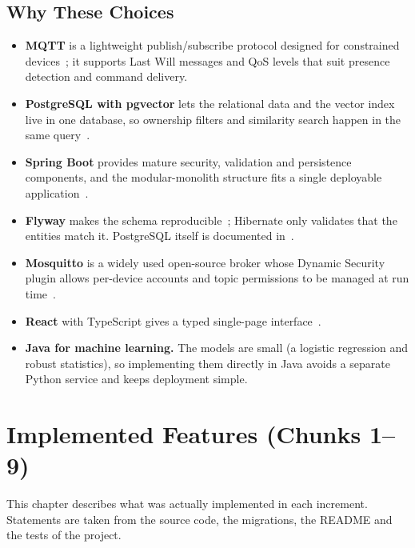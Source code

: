 \documentclass[12pt,a4paper,oneside]{report}
\begin{document}
\section{Why These Choices}
\begin{itemize}
  \item \textbf{MQTT} is a lightweight publish/subscribe protocol designed for constrained devices~\cite{mqtt311}; it supports Last Will messages and QoS levels that suit presence detection and command delivery.
  \item \textbf{PostgreSQL with pgvector} lets the relational data and the vector index live in one database, so ownership filters and similarity search happen in the same query~\cite{pgvector}.
  \item \textbf{Spring Boot} provides mature security, validation and persistence components, and the modular-monolith structure fits a single deployable application~\cite{springboot}.
  \item \textbf{Flyway} makes the schema reproducible~\cite{flyway}; Hibernate only validates that the entities match it. PostgreSQL itself is documented in~\cite{postgres}.
  \item \textbf{Mosquitto} is a widely used open-source broker whose Dynamic Security plugin allows per-device accounts and topic permissions to be managed at run time~\cite{mosquitto}.
  \item \textbf{React} with TypeScript gives a typed single-page interface~\cite{react}.
  \item \textbf{Java for machine learning.} The models are small (a logistic regression and robust statistics), so implementing them directly in Java avoids a separate Python service and keeps deployment simple.
\end{itemize}

\chapter{Implemented Features (Chunks 1--9)}
\label{ch:features}

This chapter describes what was actually implemented in each increment. Statements are taken from the source code, the migrations, the README and the tests of the project.

\end{document}
